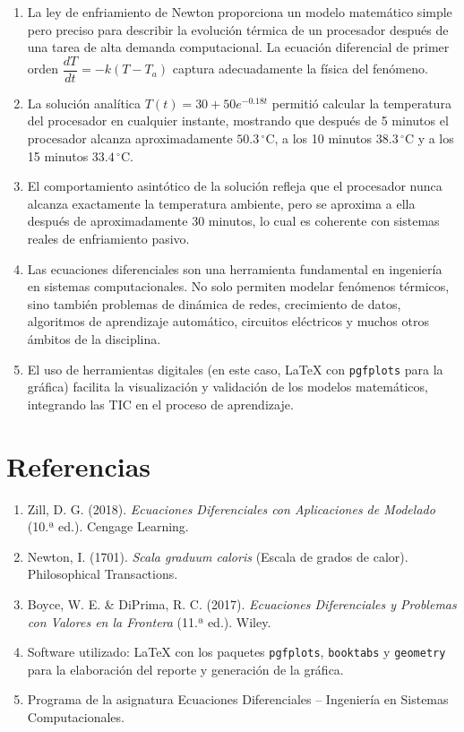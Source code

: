 \documentclass[12pt,a4paper]{article}
\begin{document}
\begin{enumerate}
  \item La ley de enfriamiento de Newton proporciona un modelo matemático
        simple pero preciso para describir la evolución térmica de un
        procesador después de una tarea de alta demanda computacional.
        La ecuación diferencial de primer orden
        \(\dfrac{dT}{dt} = -k(T - T_a)\) captura adecuadamente la física
        del fenómeno.

  \item La solución analítica \(T(t) = 30 + 50e^{-0.18t}\) permitió calcular
        la temperatura del procesador en cualquier instante, mostrando que
        después de 5 minutos el procesador alcanza aproximadamente
        \(50.3\,{}^\circ\mathrm{C}\), a los 10 minutos
        \(38.3\,{}^\circ\mathrm{C}\) y a los 15 minutos
        \(33.4\,{}^\circ\mathrm{C}\).

  \item El comportamiento asintótico de la solución refleja que el procesador
        nunca alcanza exactamente la temperatura ambiente, pero se aproxima a
        ella después de aproximadamente 30 minutos, lo cual es coherente con
        sistemas reales de enfriamiento pasivo.

  \item Las ecuaciones diferenciales son una herramienta fundamental en
        ingeniería en sistemas computacionales. No solo permiten modelar
        fenómenos térmicos, sino también problemas de dinámica de redes,
        crecimiento de datos, algoritmos de aprendizaje automático, circuitos
        eléctricos y muchos otros ámbitos de la disciplina.

  \item El uso de herramientas digitales (en este caso, \LaTeX{} con
        \texttt{pgfplots} para la gráfica) facilita la visualización y
        validación de los modelos matemáticos, integrando las TIC en el
        proceso de aprendizaje.
\end{enumerate}

\section{Referencias}

\begin{enumerate}
  \item Zill, D. G. (2018). \textit{Ecuaciones Diferenciales con Aplicaciones
        de Modelado} (10.ª ed.). Cengage Learning.
  \item Newton, I. (1701). \textit{Scala graduum caloris} (Escala de grados
        de calor). Philosophical Transactions.
  \item Boyce, W. E. \& DiPrima, R. C. (2017). \textit{Ecuaciones
        Diferenciales y Problemas con Valores en la Frontera} (11.ª ed.).
        Wiley.
  \item Software utilizado: \LaTeX{} con los paquetes \texttt{pgfplots},
        \texttt{booktabs} y \texttt{geometry} para la elaboración del reporte
        y generación de la gráfica.
  \item Programa de la asignatura Ecuaciones Diferenciales -- Ingeniería en
        Sistemas Computacionales.
\end{enumerate}
\end{document}
